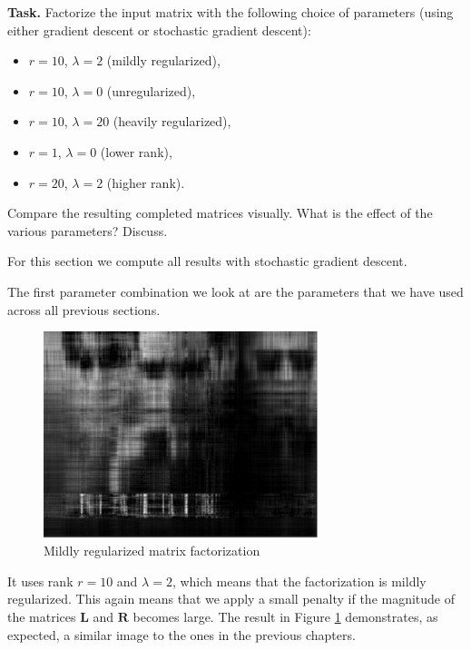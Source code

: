 \documentclass{support/acm_proc_article-sp}
\begin{document}
    \textbf{Task.} Factorize the input matrix with the following choice of parameters (using either gradient descent
    or stochastic gradient descent):
    \begin{itemize}
        \item $r = 10$, $\lambda = 2$ (mildly regularized),
        \item $r = 10$, $\lambda = 0$ (unregularized),
        \item $r = 10$, $\lambda = 20$ (heavily regularized),
        \item $r = 1$, $\lambda = 0$ (lower rank),
        \item $r = 20$, $\lambda = 2$ (higher rank).
    \end{itemize}
    Compare the resulting completed matrices visually.
    What is the effect of the various parameters?
    Discuss.

    For this section we compute all results with stochastic gradient descent.

    The first parameter combination we look at are the parameters that we have used across all previous sections.
    \begin{figure}[htbp]
        \centering
        \includegraphics[width=8cm]{images/sgd_r10_l2.png}
        \caption{Mildly regularized matrix factorization}
        \label{fig:sgd_r10_l2}
    \end{figure}
    It uses rank $r = 10$ and $\lambda = 2$, which means that the factorization is mildly regularized.
    This again means that we apply a small penalty if the magnitude of the matrices $\mathbf{L}$ and $\mathbf{R}$
    becomes large.
    The result in Figure \ref{fig:sgd_r10_l2} demonstrates, as expected, a similar image to the ones in the previous chapters.
\end{document}
